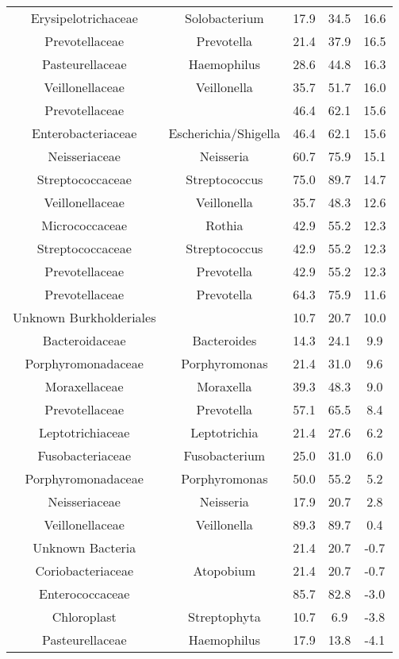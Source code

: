 \begin{table}
\begin{center}
\begin{tabular}{ccccc}
	Erysipelotrichaceae & Solobacterium & 17.9 & 34.5 & 16.6 \\
	Prevotellaceae & Prevotella & 21.4 & 37.9 & 16.5 \\
	Pasteurellaceae & Haemophilus & 28.6 & 44.8 & 16.3 \\
	Veillonellaceae & Veillonella & 35.7 & 51.7 & 16.0 \\
	Prevotellaceae &  & 46.4 & 62.1 & 15.6 \\
	Enterobacteriaceae & Escherichia/Shigella & 46.4 & 62.1 & 15.6 \\
	Neisseriaceae & Neisseria & 60.7 & 75.9 & 15.1 \\
	Streptococcaceae & Streptococcus & 75.0 & 89.7 & 14.7 \\
	Veillonellaceae & Veillonella & 35.7 & 48.3 & 12.6 \\
	Micrococcaceae & Rothia & 42.9 & 55.2 & 12.3 \\
	Streptococcaceae & Streptococcus & 42.9 & 55.2 & 12.3 \\
	Prevotellaceae & Prevotella & 42.9 & 55.2 & 12.3 \\
	Prevotellaceae & Prevotella & 64.3 & 75.9 & 11.6 \\
	Unknown Burkholderiales &  & 10.7 & 20.7 & 10.0 \\
	Bacteroidaceae & Bacteroides & 14.3 & 24.1 & 9.9 \\
	Porphyromonadaceae & Porphyromonas & 21.4 & 31.0 & 9.6 \\
	Moraxellaceae & Moraxella & 39.3 & 48.3 & 9.0 \\
	Prevotellaceae & Prevotella & 57.1 & 65.5 & 8.4 \\
	Leptotrichiaceae & Leptotrichia & 21.4 & 27.6 & 6.2 \\
	Fusobacteriaceae & Fusobacterium & 25.0 & 31.0 & 6.0 \\
	Porphyromonadaceae & Porphyromonas & 50.0 & 55.2 & 5.2 \\
	Neisseriaceae & Neisseria & 17.9 & 20.7 & 2.8 \\
	Veillonellaceae & Veillonella & 89.3 & 89.7 & 0.4 \\
	Unknown Bacteria &  & 21.4 & 20.7 & -0.7 \\
	Coriobacteriaceae & Atopobium & 21.4 & 20.7 & -0.7 \\
	Enterococcaceae &  & 85.7 & 82.8 & -3.0 \\
	Chloroplast & Streptophyta & 10.7 & 6.9 & -3.8 \\
	Pasteurellaceae & Haemophilus & 17.9 & 13.8 & -4.1 \\

\end{tabular}
\end{center}
\end{table}
